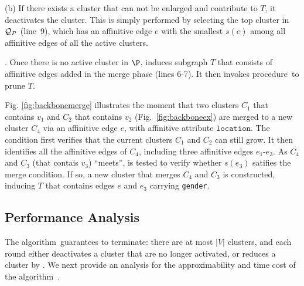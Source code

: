 \sstab
(b) If there
exists a cluster that can not be enlarged
and contribute to $T$, it deactivates the cluster.
This is simply performed by selecting the
top cluster in $\Q_P$ (line~9),
which has an affinitive edge $e$ with the smallest $s(e)$
among all affinitive edges of all the active clusters.


.
Once there is no active cluster in $\P$, \approxabd induces subgraph $T$ that consists of affinitive edges 
added in the merge phase (lines 6-7). It then invokes
procedure~ to prune $T$. 

\begin{example}
\label{exa- ABD running}
Fig. \ref{fig:backbonemerge} illustrates the moment that two clusters
$C_1$ that contains $v_1$
and $C_2$ that contains $v_2$
(Fig.~\ref{fig:backboneex}) are
 merged to a new cluster $C_4$ via
 an affinitive edge
$e$, with affinitive attribute ${\texttt{location}}$.
The condition \isgrow first verifies
that the current clusters
$C_1$ and $C_2$ can still grow.
It then identifies all the affinitive
edges of $C_4$, including
three affinitive edges $e_1$-$e_3$.
As $C_4$ and $C_3$ (that contais
$v_3$) ``meets'',
\ismerge is tested to verify
whether $s(e_3)$ satifies
the merge condition.
If so, a new cluster that
merges $C_4$ and $C_3$ is constructed,
inducing $T$ that contains
edges $e$ and $e_3$ carrying
{\texttt{gender}}.
\end{example}


\subsection{Performance Analysis}

The algorithm~\approxabd guarantees to terminate:
there are at most $|V|$ clusters, and each round
either deactivates a cluster that are no longer
activated, or reduces a cluster by \merge.
We next provide an analysis for the approximability and
time cost of the algorithm~\approxabd.


